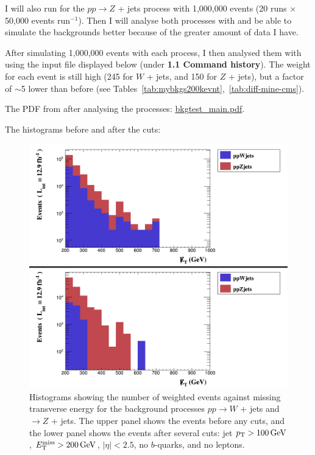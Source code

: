 I will also run \madgraph for the $pp \rightarrow Z$ + jets process with 1,000,000 events (20 runs $\times$ 50,000 events run$^{-1}$). Then I will analyse both processes with \madanalysis and be able to simulate the backgrounds better because of the greater amount of data I have.

After simulating 1,000,000 \madgraph events with each process, I then analysed them with \madanalysis using the input file displayed below (under \textbf{1.1 Command history}). The weight for each event is still high (245 for $W$ + jets, and 150 for $Z$ + jets), but a factor of $\sim$5 lower than before (see Tables~\ref{tab:mybkgs200kevnt},~\ref{tab:diff-mine-cms}).

The PDF from \madanalysis after analysing the processes: \href{run:sec15/bkgtest_main.pdf}{bkgtest\_main.pdf}.

The histograms before and after the cuts:

\begin{figure}[H]
\centering
\includegraphics[width=\textwidth]{./sec15/combined_selection.png}
\caption{Histograms showing the number of weighted events against missing transverse energy for the background processes $pp \rightarrow W$ + jets and $\rightarrow Z$ + jets. The upper panel shows the events before any cuts, and the lower panel shows the events after several cuts: jet $p_{\mathrm{T}} > 100\,\text{G\text{e\kern-0.15ex V}}$, $E_{\mathrm{T}}^{\text{miss}} > 200\,\text{G\text{e\kern-0.15ex V}}$, $|\eta| < 2.5$, no $b$-quarks, and no leptons.}
\end{figure}

